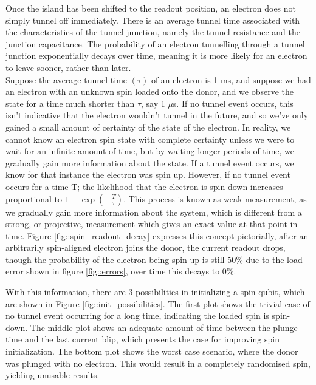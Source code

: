 	Once the island has been shifted to the readout position, an electron does not simply tunnel off immediately. There is an average tunnel time associated with the characteristics of the tunnel junction, namely the tunnel resistance and the junction capacitance. The probability of an electron tunnelling through a tunnel junction exponentially decays over time, meaning it is more likely for an electron to leave sooner, rather than later. \\
	
	Suppose the average tunnel time $(\tau)$ of an electron is 1 ms, and suppose we had an electron with an unknown spin loaded onto the donor, and we observe the state for a time much shorter than $\tau$, say 1 $\mu$s. If no tunnel event occurs, this isn't indicative that the electron wouldn't tunnel in the future, and so we've only gained a small amount of certainty of the state of the electron. In reality, we cannot know an electron spin state with complete certainty unless we were to wait for an infinite amount of time, but by waiting longer periods of time, we gradually gain more information about the state. If a tunnel event occurs, we know for that instance the electron was spin up. However, if no tunnel event occurs for a time T; the likelihood that the electron is spin down increases proportional to $1-\exp\left(-\frac{T}{\tau}\right)$.  This process is known as weak measurement, as we gradually gain more information about the system, which is different from a strong, or projective, measurement which gives an exact value at that point in time. Figure \ref{fig::spin_readout_decay} expresses this concept pictorially, after an arbitrarily spin-aligned electron joins the donor, the current readout drops, though the probability of the electron being spin up is still 50\% due to the load error shown in figure \ref{fig::errors}, over time this decays to 0\%. 
	
	With this information, there are 3 possibilities in initializing a spin-qubit, which are shown in Figure \ref{fig::init_possibilities}. The first plot shows the trivial case of no tunnel event occurring for a long time, indicating the loaded spin is spin-down. The middle plot shows an adequate amount of time between the plunge time and the last current blip, which presents the case for improving spin initialization. The bottom plot shows the worst case scenario, where the donor was plunged with no electron. This would result in a completely randomised spin, yielding unusable results. 
	

